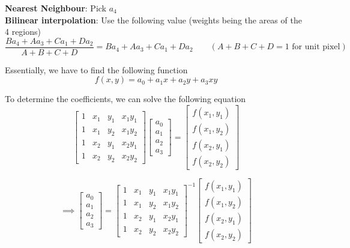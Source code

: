 \documentclass{report}
\begin{document}
\textbf{Nearest Neighbour}: Pick $a_4$ \\

\textbf{Bilinear interpolation}: Use the following value (weights being the areas of the 4 regions)
$$
  \frac{Ba_4 + Aa_3 + Ca_1 + Da_2}{A+B+C+D} = Ba_4 + Aa_3 + Ca_1 + Da_2 \qquad (A+B+C+D = 1 \text{ for unit pixel})
$$

Essentially, we have to find the following function
$$
  f(x,y) = a_0 + a_1x + a_2y + a_3xy
$$

To determine the coefficients, we can solve the following equation
$$
  \begin{bmatrix}
    1 & x_1 & y_1 & x_1y_1 \\
    1 & x_1 & y_2 & x_1y_2 \\
    1 & x_2 & y_1 & x_2y_1 \\
    1 & x_2 & y_2 & x_2y_2
  \end{bmatrix}
  \begin{bmatrix}
    a_0 \\
    a_1 \\
    a_2 \\
    a_3
  \end{bmatrix} =
  \begin{bmatrix}
    f(x_1,y_1) \\
    f(x_1,y_2) \\
    f(x_2,y_1) \\
    f(x_2,y_2)
  \end{bmatrix}
$$

$$
  \implies
  \begin{bmatrix}
    a_0 \\
    a_1 \\
    a_2 \\
    a_3
  \end{bmatrix} =
  \begin{bmatrix}
    1 & x_1 & y_1 & x_1y_1 \\
    1 & x_1 & y_2 & x_1y_2 \\
    1 & x_2 & y_1 & x_2y_1 \\
    1 & x_2 & y_2 & x_2y_2
  \end{bmatrix}^{-1}
  \begin{bmatrix}
    f(x_1,y_1) \\
    f(x_1,y_2) \\
    f(x_2,y_1) \\
    f(x_2,y_2)
  \end{bmatrix}
$$
\vspace{5mm}
\end{document}
